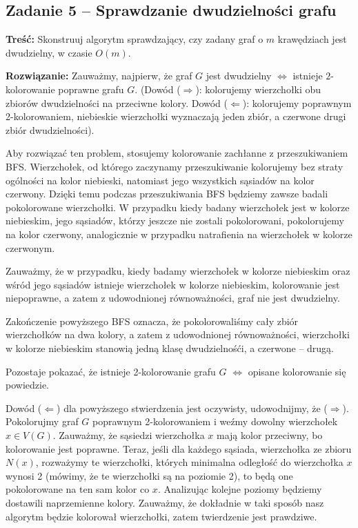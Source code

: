 \subsection{Zadanie 5 -- Sprawdzanie dwudzielności grafu}
\label{exc:bipart}
\textbf{Treść: } Skonstruuj algorytm sprawdzający, 
czy zadany graf o $m$ krawędziach jest dwudzielny, w czasie $O(m)$.

\textbf{Rozwiązanie: } Zauważmy, najpierw, że 
graf $G$ jest dwudzielny $\Leftrightarrow$ istnieje $2$-kolorowanie
poprawne grafu $G$. (Dowód ($\Rightarrow$): kolorujemy 
wierzchołki obu zbiorów dwudzielności na przeciwne kolory. Dowód 
($\Leftarrow$): kolorujemy poprawnym 2-kolorowaniem, niebieskie
wierzchołki wyznaczają jeden zbiór, a czerwone drugi zbiór dwudzielności). 

Aby rozwiązać ten problem, stosujemy kolorowanie 
zachłanne z przeszukiwaniem BFS. 
Wierzchołek, od którego zaczynamy przeszukiwanie kolorujemy bez straty
ogólności na kolor niebieski, natomiast jego wszystkich sąsiadów na kolor czerwony.
Dzięki temu podczas przeszukiwania BFS będziemy zawsze badali pokolorowane 
wierzchołki. W przypadku kiedy badany wierzchołek jest w kolorze niebieskim, jego 
sąsiadów, którzy jeszcze nie zostali pokolorowani, pokolorujemy na kolor czerwony, analogicznie
w przypadku natrafienia na wierzchołek w kolorze czerwonym. 

Zauważmy, że w przypadku, kiedy badamy wierzchołek w kolorze niebieskim oraz wśród jego sąsiadów
istnieje wierzchołek w kolorze niebieskim, kolorowanie jest niepoprawne, a zatem z udowodnionej 
równoważności, graf nie jest dwudzielny.

Zakończenie powyższego BFS oznacza, że pokolorowaliśmy cały zbiór wierzchołków na
dwa kolory, a zatem z udowodnionej równoważności,
wierzchołki w kolorze niebieskim stanowią jedną klasę dwudzielnośći, a czerwone -- drugą.

Pozostaje pokazać, że istnieje 2-kolorowanie grafu $G$ $\Leftrightarrow$ opisane kolorowanie się powiedzie.

Dowód ($\Leftarrow$) dla powyższego stwierdzenia jest oczywisty, udowodnijmy, że ($\Rightarrow$). Pokolorujmy graf $G$
poprawnym 2-kolorowaniem i weźmy dowolny wierzchołek $x \in V(G)$. Zauważmy, że sąsiedzi
wierzchołka $x$ mają kolor przeciwny, bo kolorowanie jest poprawne. Teraz, jeśli dla każdego
sąsiada, wierzchołka ze zbioru $N(x)$, rozważymy te wierzchołki, których minimalna odległość do wierzchołka 
$x$ wynosi 2 (mówimy, że te wierzchołki są na poziomie 2), to będą one pokolorowane na ten sam 
kolor co $x$. Analizując kolejne poziomy
będziemy dostawili naprzemienne kolory. Zauważmy, że dokładnie w taki sposób nasz algorytm
będzie kolorował wierzchołki, zatem twierdzenie jest prawdziwe.

